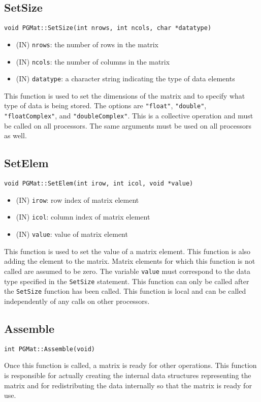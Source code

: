 \documentclass[12pt]{article}
\begin{document}
\subsection{SetSize}
\begin{verbatim}
void PGMat::SetSize(int nrows, int ncols, char *datatype)
\end{verbatim}
\begin{itemize}
\item (IN) \texttt{nrows}: the number of rows in the matrix
\item (IN) \texttt{ncols}: the number of columns in the matrix
\item (IN) \texttt{datatype}: a character string indicating the type of data
elements
\end{itemize}
This function is used to set the dimensions of the matrix and to specify what
type of data is being stored. The options are \texttt{"float"},
\texttt{"double"}, \texttt{"floatComplex"}, and \texttt{"doubleComplex"}. This
is a collective operation and must be called on all processors. The same
arguments must be used on all processors as well.
\subsection{SetElem}
\begin{verbatim}
void PGMat::SetElem(int irow, int icol, void *value)
\end{verbatim}
\begin{itemize}
\item (IN) \texttt{irow}: row index of matrix element
\item (IN) \texttt{icol}: column index of matrix element
\item (IN) \texttt{value}: value of matrix element
\end{itemize}
This function is used to set the value of a matrix element. This function is
also adding the element to the matrix. Matrix elements for which this function is
not called are assumed to be zero. The variable \texttt{value} must correspond
to the data type specified in the \texttt{SetSize} statement. This function can
only be called after the \texttt{SetSize} function has been called. This
function is local and can be called independently of any calls on other
processors.
\subsection{Assemble}
\begin{verbatim}
int PGMat::Assemble(void)
\end{verbatim}
Once this function is called, a matrix is ready for other operations. This
function is responsible for actually creating the internal data structures
representing the matrix and for redistributing the data internally so that the
matrix is ready for use.
\end{document}
